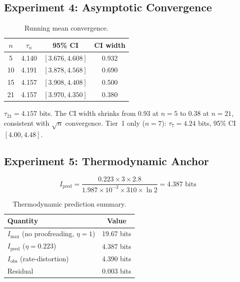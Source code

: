 \documentclass[12pt,a4paper]{article}
\begin{document}
\subsection{Experiment 4: Asymptotic Convergence}

\begin{table}[ht]
\centering
\caption{Running mean convergence.}
\begin{tabular}{cccc}
\toprule
$n$ & $\tau_n$ & 95\% CI & CI width \\
\midrule
5 & 4.140 & $[3.676, 4.608]$ & 0.932 \\
10 & 4.191 & $[3.878, 4.568]$ & 0.690 \\
15 & 4.157 & $[3.908, 4.408]$ & 0.500 \\
21 & 4.157 & $[3.970, 4.350]$ & 0.380 \\
\bottomrule
\end{tabular}
\label{tab:convergence}
\end{table}

$\tau_{21} = 4.157$ bits. The CI width shrinks from 0.93 at $n = 5$ to 0.38 at $n = 21$, consistent with $\sqrt{n}$ convergence. Tier~1 only ($n = 7$): $\tau_7 = 4.24$ bits, 95\% CI $[4.00, 4.48]$.

\subsection{Experiment 5: Thermodynamic Anchor}

\begin{equation}
I_{\mathrm{pred}} = \frac{0.223 \times 3 \times 2.8}{1.987 \times 10^{-3} \times 310 \times \ln 2} = 4.387 \text{ bits}
\end{equation}

\begin{table}[ht]
\centering
\caption{Thermodynamic prediction summary.}
\begin{tabular}{lc}
\toprule
Quantity & Value \\
\midrule
$I_{\max}$ (no proofreading, $\eta = 1$) & 19.67 bits \\
$I_{\mathrm{pred}}$ ($\eta = 0.223$) & 4.387 bits \\
$I_{\mathrm{obs}}$ (rate-distortion) & 4.390 bits \\
Residual & 0.003 bits \\
\bottomrule
\end{tabular}
\label{tab:thermo}
\end{table}
\end{document}
